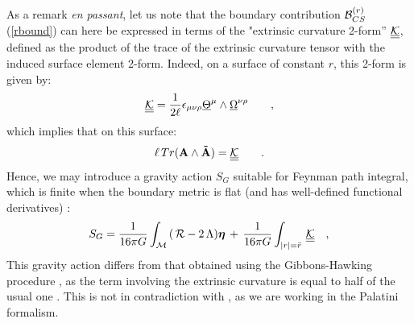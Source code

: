 \documentclass[a4paper,10pt]{article}
\begin{document}
As a remark {\it en passant}, let us note that the boundary contribution  
${\cal B}_{CS}^{(r)}$ (\ref{rbound})  
can here be expressed in terms of the  
"extrinsic curvature 2-form'' ${\cal \underline {\underline {K}}}$, 
defined as the product of  
the trace of the extrinsic curvature tensor with the induced  
surface element 2-form. Indeed, on a surface of constant $r$,  
this 2-form is  
given by: 
\begin{equation} 
{\cal \underline {\underline {K}}}= \frac 1 {2 \ell} 
\epsilon_{\mu\nu\rho} \underline \Theta ^\mu \wedge  
\underline \Omega^{\nu\rho} \qquad , 
\end{equation} 
which implies that on this surface: 
\begin{equation} 
\ell \, Tr ({\bf A}\wedge {\bf \tilde A})=  
{\cal \underline{\underline{K}}} \qquad . 
\end{equation} 
Hence, we may introduce a gravity action $S_G$ suitable for Feynman 
path integral, which  
is finite when the boundary metric is flat (and has well-defined 
functional derivatives) \cite{MB}: 
\begin{equation} 
S_G = \frac 1 {16 \pi G} \int_{\cal M} \,  
   ( \, { \cal R} - 2 \, \Lambda ) 
       {\boldsymbol{\eta}} \, + \, \frac 1 {16 \pi G} 
\int_{|r|=\bar r} \, {\cal \underline {\underline {K}}} \quad , 
\end{equation} 
This gravity action differs from that obtained using the 
Gibbons-Hawking procedure \cite{GH}, as  
the term involving the extrinsic 
curvature is equal to half of the usual one \cite{BAN}. This is not 
in contradiction with \cite{GH}, as we are working in the Palatini 
formalism. 
 
\end{document}
